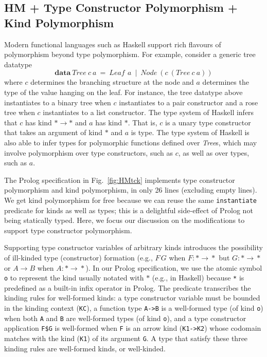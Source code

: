 \documentclass[runningheads,a4paper]{llncs}
\begin{document}
\subsection{HM + Type Constructor Polymorphism + Kind Polymorphism}
\label{ssec:HMtck}
Modern functional languages such as Haskell support rich flavours of
polymorphism beyond type polymorphism. For example, consider
a generic tree datatype
\[ \textbf{data}~\textit{Tree}~c~a
  ~=~ \textit{Leaf}\,~a ~\mid~ \textit{Node}~(c~(Tree~c~a)) \]
where $c$ determines the branching structure at the node and $a$
determines the type of the value hanging on the leaf. For instance,
the tree datatype above instantiates to a binary tree
when $c$ instantiates to a pair constructor and
a rose tree when $c$ instantiates to a list constructor.
The type system of Haskell infers that $c$ has kind $*\to*$ and
$a$ has kind $*$. That is, $c$ is a unary type constructor
that takes an argument of kind $*$ and $a$ is type. The type system of
Haskell is also able to infer types for polymorphic functions defined
over \textit{Tree}s, which may involve polymorphism over type constructors,
such as $c$, as well as over types, such as $a$.

The Prolog specification in Fig.~\ref{fig:HMtck} implements
type constructor polymorphism and kind polymorphism, in only 26 lines
(excluding empty lines).
We get kind polymorphism for free because we can reuse
the same \verb|instantiate| predicate for kinds as well as types;
this is a delightful side-effect of Prolog not being statically typed.
Here, we focus our discussion on the modifications to support
type constructor polymorphism.

Supporting type constructor variables of
arbitrary kinds introduces the possibility of ill-kinded type (constructor)
formation (e.g., $F\,G$ when $F:*\!\to\!*$ but $G:*\!\to\!*$ \;or\; 
$A\!\to\!B$ when $A:*\!\to\!*$). In our Prolog specification, we use
the atomic symbol \verb|o| to represent the kind usually notated with $*$
(e.g., in Haskell) because \verb|*| is predefined as a built-in infix
operator in Prolog. The  predicate transcribes the kinding rules
for well-formed kinds: a type constructor variable must be bounded in
the kinding context (\verb|KC|), a function type \verb|A->B| is
a well-formed type (of kind \verb|o|) when both \verb|A| and \verb|B|
are well-formed types (of kind \verb|o|), and a type constructor application
\verb|F$G| is well-formed when \verb|F| is an arrow kind (\verb|K1->K2|)
whose codomain matches with the kind (\verb|K1|) of its argument \verb|G|.
A type that satisfy these three kinding rules are well-formed kinds, 
or well-kinded.
\end{document}
